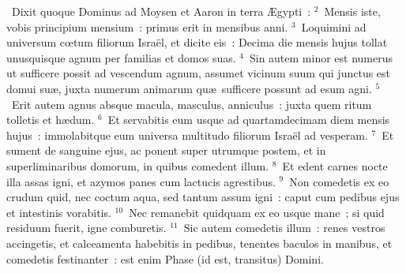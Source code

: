 ~\lettrine[lines=10,image=true,loversize=0.05,lraise=-0.03]{D}{}ixit quoque Dominus ad Moysen et Aaron in terra \AE gypti~:
${}^{2}$~Mensis iste, vobis principium mensium~: primus erit in mensibus anni.
${}^{3}$~Loquimini ad universum cœtum filiorum Isra\"el, et dicite eis~: Decima die mensis hujus tollat unusquisque agnum per familias et domos suas.
${}^{4}$~Sin autem minor est numerus ut sufficere possit ad vescendum agnum, assumet vicinum suum qui junctus est domui su\ae , juxta numerum animarum qu\ae\ sufficere possunt ad esum agni.
${}^{5}$~Erit autem agnus absque macula, masculus, anniculus~: juxta quem ritum tolletis et h\ae dum.
${}^{6}$~Et servabitis eum usque ad quartamdecimam diem mensis hujus~: immolabitque eum universa multitudo filiorum Isra\"el ad vesperam.
${}^{7}$~Et sument de sanguine ejus, ac ponent super utrumque postem, et in superliminaribus domorum, in quibus comedent illum.
${}^{8}$~Et edent carnes nocte illa assas igni, et azymos panes cum lactucis agrestibus.
${}^{9}$~Non comedetis ex eo crudum quid, nec coctum aqua, sed tantum assum igni~: caput cum pedibus ejus et intestinis vorabitis.
${}^{10}$~Nec remanebit quidquam ex eo usque mane~; si quid residuum fuerit, igne comburetis.
${}^{11}$~Sic autem comedetis illum~: renes vestros accingetis, et calceamenta habebitis in pedibus, tenentes baculos in manibus, et comedetis festinanter~: est enim Phase (id est, transitus) Domini.


